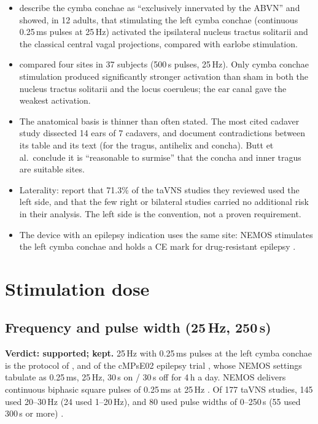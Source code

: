 \documentclass[10pt,a4paper]{article}
\newcommand{\us}{\texorpdfstring{\,\textmu s}{ us}}
\begin{document}
\begin{itemize}
  \item \textcite{frangos2015} describe the cymba conchae as ``exclusively innervated by the ABVN'' and showed, in 12
        adults, that stimulating the left cymba conchae (continuous 0.25\,ms pulses at 25\,Hz) activated the ipsilateral
        nucleus tractus solitarii and the classical central vagal projections, compared with earlobe stimulation.
  \item \textcite{yakunina2017} compared four sites in 37 subjects (500\us{} pulses, 25\,Hz). Only cymba conchae
        stimulation produced significantly stronger activation than sham in both the nucleus tractus solitarii and the
        locus coeruleus; the ear canal gave the weakest activation.
  \item The anatomical basis is thinner than often stated. The most cited cadaver study \parencite{peuker2002} dissected
        14 ears of 7 cadavers, and \textcite{butt2020} document contradictions between its table and its text (for the
        tragus, antihelix and concha). Butt et al.\ conclude it is ``reasonable to surmise'' that the concha and inner
        tragus are suitable sites.
  \item Laterality: \textcite{kim2022} report that 71.3\% of the taVNS studies they reviewed used the left side, and that
        the few right or bilateral studies carried no additional risk in their analysis. The left side is the
        convention, not a proven requirement.
  \item The device with an epilepsy indication uses the same site: NEMOS stimulates the left cymba conchae and holds a
        CE mark for drug-resistant epilepsy \parencite{yap2020}.
\end{itemize}

\section{Stimulation dose}\label{sec:dose}

\subsection{Frequency and pulse width (25\,Hz, 250\us)}\label{sec:freq}
\textbf{Verdict: supported; kept.} 25\,Hz with 0.25\,ms pulses at the left cymba conchae is the protocol of
\textcite{frangos2015}, and of the cMPsE02 epilepsy trial \parencite{bauer2016}, whose NEMOS settings
\textcite[Table 2]{yap2020} tabulate as 0.25\,ms, 25\,Hz, 30\,s on / 30\,s off for 4\,h a day. NEMOS delivers continuous
biphasic square pulses of 0.25\,ms at 25\,Hz \parencite[Gancheva et al.\ row]{farmer2020}. Of 177 taVNS studies, 145
used 20--30\,Hz (24 used 1--20\,Hz), and 80 used pulse widths of 0--250\us{} (55 used 300\us{} or more)
\parencite[Table 1, summed over its three columns]{kim2022}.
\end{document}
